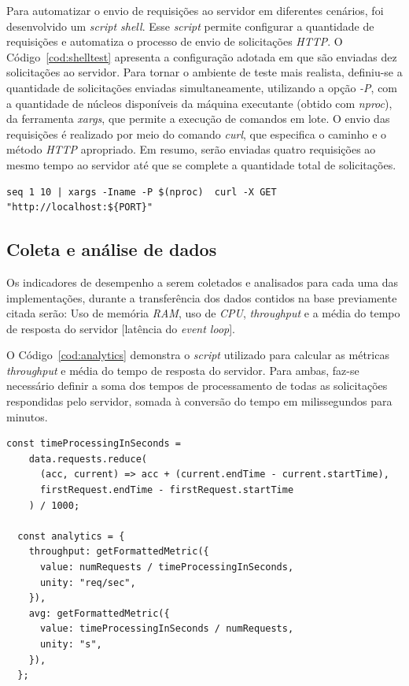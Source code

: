 \documentclass[12pt]{article}
\begin{document}
Para automatizar o envio de requisições ao servidor em diferentes cenários, 
foi desenvolvido um \textit{script shell}. Esse \textit{script} permite configurar a quantidade de 
requisições e automatiza o processo de envio de solicitações \textit{HTTP}. O Código~\ref{cod:shelltest} 
apresenta a configuração adotada em que são enviadas dez solicitações ao servidor. Para tornar o ambiente de 
teste mais realista, definiu-se a quantidade de solicitações enviadas simultaneamente, 
utilizando a opção \textit{-P}, com a quantidade de núcleos disponíveis da máquina executante (obtido com \textit{nproc}), 
da ferramenta \textit{xargs}, que permite a execução de comandos em lote. O envio 
das requisições é realizado por meio do comando \textit{curl}, que especifica o caminho e o método \textit{HTTP} apropriado.
Em resumo, serão enviadas quatro requisições ao mesmo tempo ao servidor até que se complete a quantidade total de solicitações.

\begin{lstlisting}[caption={\textit{Script} para disparo de requisições}, label=cod:shelltest]
	seq 1 10 | xargs -Iname -P $(nproc)  curl -X GET "http://localhost:${PORT}"
\end{lstlisting}


\subsection{Coleta e análise de dados}

Os indicadores de desempenho a serem coletados e analisados para cada uma das implementações, durante a transferência
dos dados contidos na base previamente citada serão: Uso de memória \textit{RAM}, uso de \textit{CPU}, \textit{throughput}
e a média do tempo de resposta do servidor [latência do \textit{event loop}].

O Código~\ref{cod:analytics} demonstra o \textit{script} utilizado para calcular as métricas \textit{throughput} e 
média do tempo de resposta do servidor. Para ambas, faz-se necessário definir a soma dos tempos de processamento de
todas as solicitações respondidas pelo servidor, somada à conversão do tempo em milissegundos para minutos.

\begin{lstlisting}[caption={Implementação do cálculo das métricas \textit{throughput} e média do tempo de resposta}, label=cod:analytics]
	const timeProcessingInSeconds =
    data.requests.reduce(
      (acc, current) => acc + (current.endTime - current.startTime),
      firstRequest.endTime - firstRequest.startTime
    ) / 1000;

  const analytics = {
    throughput: getFormattedMetric({
      value: numRequests / timeProcessingInSeconds,
      unity: "req/sec",
    }),
    avg: getFormattedMetric({
      value: timeProcessingInSeconds / numRequests,
      unity: "s",
    }),
  };
\end{lstlisting}
\end{document}
